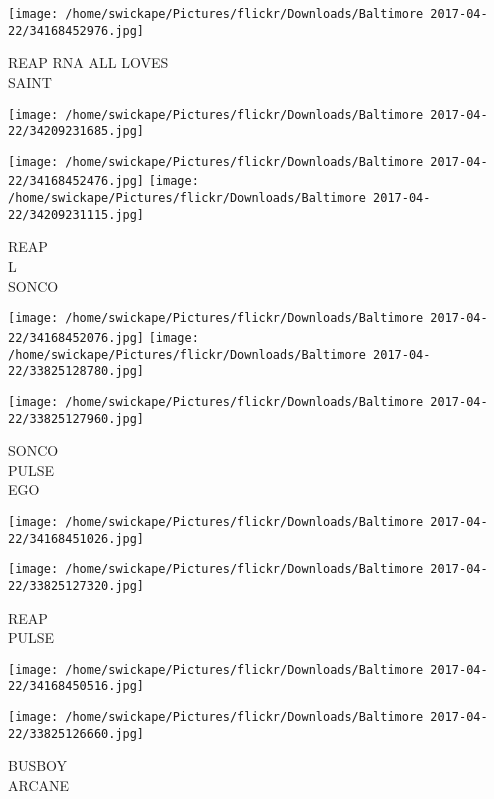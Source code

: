 \documentclass[10pt,letterpaper]{article}
\begin{document}
\vspace{0.25in}
\texttt{[image: /home/swickape/Pictures/flickr/Downloads/Baltimore 2017-04-22/34168452976.jpg]}

REAP RNA ALL LOVES\\
SAINT\\
\pagebreak

\texttt{[image: /home/swickape/Pictures/flickr/Downloads/Baltimore 2017-04-22/34209231685.jpg]}

\vspace{0.25in}
\texttt{[image: /home/swickape/Pictures/flickr/Downloads/Baltimore 2017-04-22/34168452476.jpg]}
\texttt{[image: /home/swickape/Pictures/flickr/Downloads/Baltimore 2017-04-22/34209231115.jpg]}

REAP\\
L\\
SONCO\\
\pagebreak

\texttt{[image: /home/swickape/Pictures/flickr/Downloads/Baltimore 2017-04-22/34168452076.jpg]}
\texttt{[image: /home/swickape/Pictures/flickr/Downloads/Baltimore 2017-04-22/33825128780.jpg]}

\vspace{0.25in}
\texttt{[image: /home/swickape/Pictures/flickr/Downloads/Baltimore 2017-04-22/33825127960.jpg]}

SONCO\\
PULSE\\
EGO\\
\pagebreak

\texttt{[image: /home/swickape/Pictures/flickr/Downloads/Baltimore 2017-04-22/34168451026.jpg]}

\vspace{0.25in}
\texttt{[image: /home/swickape/Pictures/flickr/Downloads/Baltimore 2017-04-22/33825127320.jpg]}

REAP\\
PULSE\\
\pagebreak

\texttt{[image: /home/swickape/Pictures/flickr/Downloads/Baltimore 2017-04-22/34168450516.jpg]}

\vspace{0.25in}
\texttt{[image: /home/swickape/Pictures/flickr/Downloads/Baltimore 2017-04-22/33825126660.jpg]}

BUSBOY\\
ARCANE\\
\pagebreak
\end{document}
